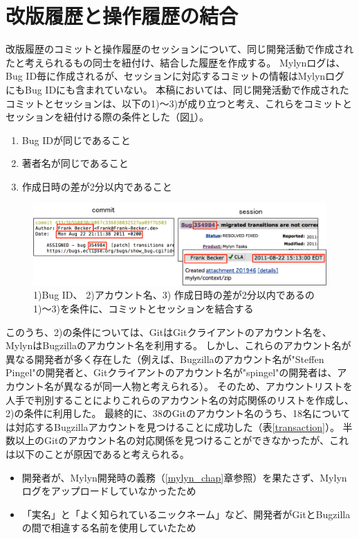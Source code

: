 \documentclass[a4paper]{jsbook}
\begin{document}
\section{改版履歴と操作履歴の結合}\label{joining_sec}
改版履歴のコミットと操作履歴のセッションについて、同じ開発活動で作成されたと考えられるもの同士を紐付け、結合した履歴を作成する。
Mylynログは、Bug ID毎に作成されるが、セッションに対応するコミットの情報はMylynログにもBug IDにも含まれていない。
本稿においては、同じ開発活動で作成されたコミットとセッションは、以下の1)〜3)が成り立つと考え、これらをコミットとセッションを紐付ける際の条件とした（図\ref{concat_figure}）。
\begin{enumerate}
  \item Bug IDが同じであること
  \item 著者名が同じであること
  \item 作成日時の差が2分以内であること
\end{enumerate}
\begin{figure}[tb]
  \centering
  \includegraphics[width = \linewidth]{resource/concatenating.pdf}
  \caption{1)Bug ID、 2)アカウント名、3) 作成日時の差が2分以内であるの1)〜3)を条件に、コミットとセッションを結合する}
  \label{concat_figure}
\end{figure}
このうち、2)の条件については、GitはGitクライアントのアカウント名を、MylynはBugzillaのアカウント名を利用する。
しかし、これらのアカウント名が異なる開発者が多く存在した（例えば、Bugzillaのアカウント名が"Steffen Pingel"の開発者と、Gitクライアントのアカウント名が"spingel"の開発者は、アカウント名が異なるが同一人物と考えられる）。
そのため、アカウントリストを人手で判別することによりこれらのアカウント名の対応関係のリストを作成し、2)の条件に利用した。
最終的に、38のGitのアカウント名のうち、18名については対応するBugzillaアカウントを見つけることに成功した（表\ref{transaction}）。
半数以上のGitのアカウント名の対応関係を見つけることができなかったが、これは以下のことが原因であると考えられる。
\begin{itemize}
  \item 開発者が、Mylyn開発時の義務（\ref{mylyn_chap}章参照）を果たさず、Mylynログをアップロードしていなかったため
  \item 「実名」と「よく知られているニックネーム」など、開発者がGitとBugzillaの間で相違する名前を使用していたため
\end{itemize}
\end{document}

